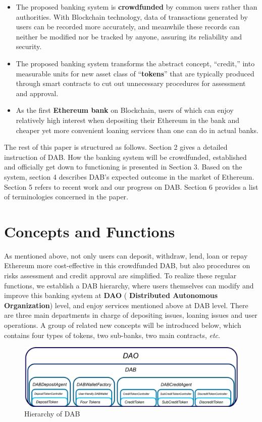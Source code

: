 \documentclass[review]{elsarticle}
\begin{document}
\begin{itemize}
   \item The proposed banking system is \textbf{crowdfunded} by common users rather than authorities. With Blockchain technology, data of transactions generated by users can be recorded more accurately, and meanwhile these records can neither be modified nor be tracked by anyone, assuring its reliability and security.
   \item The proposed banking system transforms the abstract concept, ``credit,'' into measurable units for new asset class of ``\textbf{tokens}'' that are typically produced through smart contracts to cut out unnecessary procedures for assessment and approval.
   \item As the first \textbf{Ethereum bank} on Blockchain, users of which can enjoy relatively high interest when depositing their Ethereum in the bank and cheaper yet more convenient loaning services than one can do in actual banks.
\end{itemize}

The rest of this paper is structured as follows. Section 2 gives a detailed instruction of DAB. How the banking system will be crowdfunded, established and officially get down to functioning is presented in Section 3. Based on the system, section 4 describes DAB's expected outcome in the market of Ethereum. Section 5 refers to recent work and our progress on DAB. Section 6 provides a list of terminologies concerned in the paper.

\section{Concepts and Functions}
As mentioned above, not only users can deposit, withdraw, lend, loan or repay Ethereum more cost-effective in this crowdfunded DAB, but also procedures on risks assessment and credit approval are simplified. To realize these regular functions, we establish a DAB hierarchy, where users themselves can modify and improve this banking system at \textbf{DAO} (\textbf{ Distributed Autonomous Organization}) level, and enjoy services mentioned above at DAB level. There are three main departments in charge of depositing issues, loaning issues and user operations. A group of related new concepts will be introduced below, which contains four types of tokens, two sub-banks, two main contracts, \emph{etc}.

\begin{figure}[H]
\begin{center}
\includegraphics[width=4.5in]{Graphs/DAB_Hierarchy.jpg}
\end{center}
\caption{Hierarchy of DAB}\label{HoD}
\end{figure}
\end{document}
